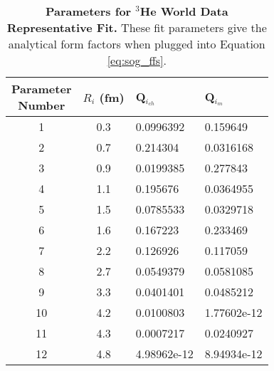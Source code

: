\begin{table}[!h]
\centering
\begin{tabular}{|c c l l|}
\hline
\makecell{\textbf{Parameter}\\ \textbf{Number}} & \textbf{$R_i$ (fm)} & \textbf{Q$_{i_{ch}}$} & \textbf{Q$_{i_{m}}$}\\
\hline
1 & 0.3 & 0.0996392 & 0.159649 \\
2 & 0.7 & 0.214304 & 0.0316168 \\
3 & 0.9 & 0.0199385 & 0.277843 \\
4 & 1.1 & 0.195676 & 0.0364955 \\
5 & 1.5 & 0.0785533 & 0.0329718 \\
6 & 1.6 & 0.167223 & 0.233469 \\
7 & 2.2 & 0.126926 & 0.117059 \\
8 & 2.7 & 0.0549379 & 0.0581085 \\
9 & 3.3 & 0.0401401 & 0.0485212 \\
10 & 4.2 & 0.0100803 & 1.77602e-12 \\
11 & 4.3 & 0.0007217 & 0.0240927 \\
12 & 4.8 & 4.98962e-12 & 8.94934e-12 \\           
\hline
\end{tabular}
\caption[Parameters for $^3$He World Data Representative Fit]{{\bf{Parameters for $^3$He World Data Representative Fit.}} These fit parameters give the analytical form factors when plugged into Equation \ref{eq:sog_ffs}.}
\label{tab:3he_rep_fit_pars}
\end{table}


